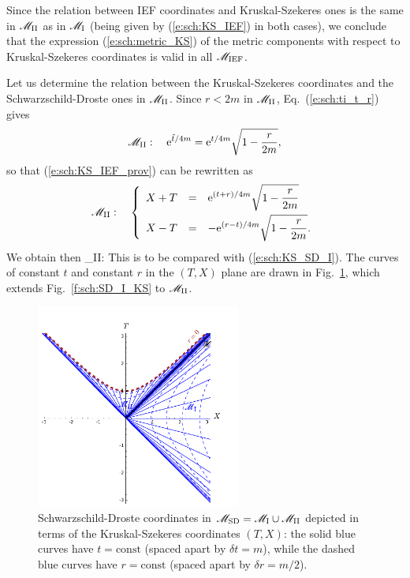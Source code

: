 Since the relation between IEF coordinates and Kruskal-Szekeres ones is the
same in $\mathscr{M}_{\rm II}$ as in $\mathscr{M}_{\rm I}$ (being given by (\ref{e:sch:KS_IEF})
in both cases), we conclude that the expression (\ref{e:sch:metric_KS})
of the metric components with respect to
Kruskal-Szekeres coordinates is valid in all $\mathscr{M}_{\rm IEF}$.

Let us determine the relation between the Kruskal-Szekeres coordinates and
the Schwarz\-schild-Droste ones in $\mathscr{M}_{\rm II}$. Since $r<2m$ in $\mathscr{M}_{\rm II}$,
Eq.~(\ref{e:sch:ti_t_r}) gives
\[
    \mathscr{M}_{\rm II}: \quad  \mathrm{e}^{{\tilde t}/4m} = \mathrm{e}^{t/4m}  \sqrt{1 -  \frac{r}{2m} } ,
\]
so that (\ref{e:sch:KS_IEF_prov}) can be rewritten as
\[
     \mathscr{M}_{\rm II}: \quad
\left\{\begin{array}{lcl}
    X+T & = & \displaystyle \mathrm{e}^{(t+r)/4m} \sqrt{1 -  \frac{r}{2m} }  \\[2ex]
    X-T & = & \displaystyle  - \mathrm{e}^{(r -t)/4m}  \sqrt{1 -  \frac{r}{2m} }.
    \end{array}\right.
\]
We obtain then
\be \label{e:sch:KS_SD_II}
    \M_{\rm II}: \quad {}
    \iff
\ee
This is to be compared with (\ref{e:sch:KS_SD_I}).
The curves of constant $t$ and constant $r$ in the $(T,X)$ plane
are drawn in Fig.~\ref{f:sch:SD_KS}, which extends Fig.~\ref{f:sch:SD_I_KS}
to $\mathscr{M}_{\rm II}$.

\begin{figure}
\centerline{\includegraphics[width=0.6\textwidth]{sch_SD_KS.pdf}}
\caption[]{\label{f:sch:SD_KS} \footnotesize
Schwarzschild-Droste coordinates in $\mathscr{M}_{\rm SD} = \mathscr{M}_{\rm I}\cup \mathscr{M}_{\rm II}$
depicted in terms of the Kruskal-Szekeres coordinates $(T,X)$: the solid blue
curves have $t=\mathrm{const}$ (spaced apart by $\delta t = m$), while the
dashed blue curves have $r=\mathrm{const}$ (spaced apart by $\delta r = m/2$).}
\end{figure}


